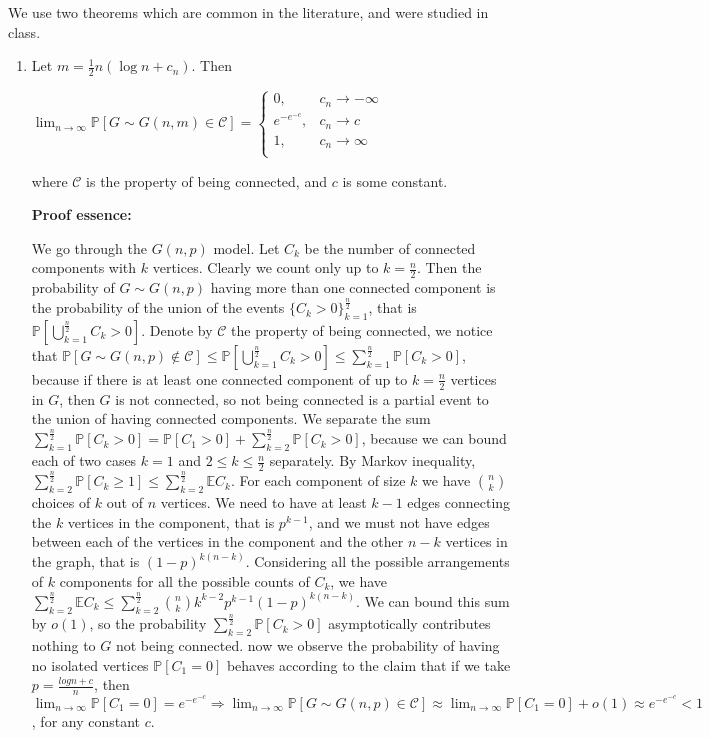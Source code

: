\documentclass{article}
\begin{document}
We use two theorems which are common in the literature, and were studied in class.
\begin{enumerate}
    \item Let $m=\frac{1}{2}n(\log{n}+c_n)$. Then

    $\lim_{n\rightarrow\infty}\mathbb{P}[G\sim{G(n,m)}\in\mathcal{C}]=\begin{cases}
        0, & c_n\rightarrow{-\infty} \\
        e^{-e^{-c}}, & c_n\rightarrow{c} \\
        1, & c_n\rightarrow\infty \\
    \end{cases}$

    where $\mathcal{C}$ is the property of being connected, and $c$ is some constant.

    \textbf{Proof essence:}

    We go through the $G(n,p)$ model.
Let $C_k$ be the number of connected components with $k$ vertices. Clearly we count only up to $k=\frac{n}{2}$. Then the probability of $G\sim{G(n,p)}$ having more than one connected component is the probability of the union of the events $\{C_k>0\}_{k=1}^\frac{n}{2}$, that is $\mathbb{P}[\bigcup_{k=1}^\frac{n}{2}C_k>0]$. Denote by $\mathcal{C}$ the property of being connected, we notice that $\mathbb{P}[G\sim{G(n,p)}\notin\mathcal{C}]\leq\mathbb{P}[\bigcup_{k=1}^\frac{n}{2}C_k>0]\leq\sum_{k=1}^\frac{n}{2}\mathbb{P}[C_k>0]$, because if there is at least one connected component of up to $k=\frac{n}{2}$ vertices in $G$, then $G$ is not connected, so not being connected is a partial event to the union of having connected components. We separate the sum $\sum_{k=1}^\frac{n}{2}\mathbb{P}[C_k>0]=\mathbb{P}[C_1>0]+\sum_{k=2}^\frac{n}{2}\mathbb{P}[C_k>0]$, because we can bound each of two cases $k=1$ and $2\leq{k}\leq\frac{n}{2}$ separately. By Markov inequality, $\sum_{k=2}^\frac{n}{2}\mathbb{P}[C_k\geq{1}]\leq\sum_{k=2}^\frac{n}{2}\mathbb{E}C_k$. For each component of size $k$ we have $\binom{n}{k}$ choices of $k$ out of $n$ vertices. We need to have at least $k-1$ edges connecting the $k$ vertices in the component, that is $p^{k-1}$, and we must not have edges between each of the vertices in the component and the other $n-k$ vertices in the graph, that is $(1-p)^{k(n-k)}$. Considering all the possible arrangements of $k$ components for all the possible counts of $C_k$, we have $\sum_{k=2}^\frac{n}{2}\mathbb{E}C_k\leq\sum_{k=2}^\frac{n}{2}\binom{n}{k}k^{k-2}p^{k-1}(1-p)^{k(n-k)}$. We can bound this sum by $o(1)$, so the probability $\sum_{k=2}^\frac{n}{2}\mathbb{P}[C_k>0]$ asymptotically contributes nothing to $G$ not being connected. now we observe the probability of having no isolated vertices $\mathbb{P}[C_1=0]$ behaves according to the claim that if we take $p=\frac{log{n}+c}{n}$, then $\lim_{n\rightarrow\infty}\mathbb{P}[C_1=0]=e^{-e^{-c}}\Rightarrow\lim_{n\rightarrow\infty}\mathbb{P}[G\sim{G(n,p)}\in\mathcal{C}]\approx\lim_{n\rightarrow\infty}\mathbb{P}[C_1=0]+o(1)\approx{e^{-e^{-c}}}<1$, for any constant $c$.


\end{enumerate}
\end{document}
